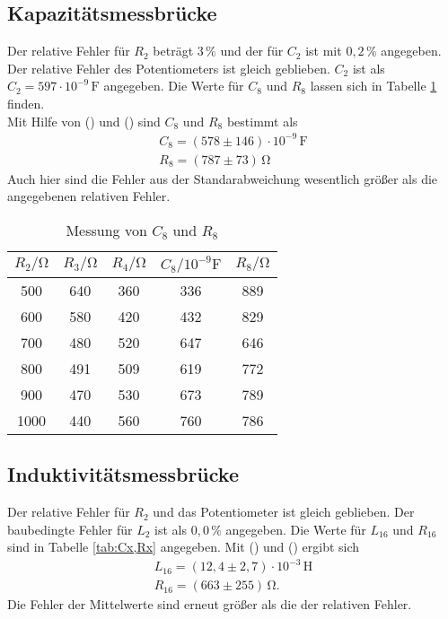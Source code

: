 \subsection{Kapazitätsmessbrücke}
Der relative Fehler für $R_2$ beträgt $3\,\%$ und der für $C_2$ ist mit $0,2 \,\%$ angegeben. Der relative Fehler des Potentiometers ist gleich geblieben.
$C_2$ ist als $C_2 = 597 \cdot 10^{-9}\,\unit{\farad}$ angegeben. Die Werte für $C_8$ und $R_8$ lassen sich in Tabelle \ref{tab:C8,R8} finden.\\
Mit Hilfe von () und () sind $C_8$ und $R_8$ bestimmt als
\begin{gather*}
  C_8 = (578 \pm 146)\cdot 10^{-9} \,\unit{\farad} \\
  R_8 = (787 \pm 73)\,\unit{\ohm}
\end{gather*}
Auch hier sind die Fehler aus der Standarabweichung wesentlich größer als die angegebenen relativen Fehler.

\begin{table}
  \centering
  \caption{Messung von $C_8$ und $R_8$}
  \label{tab:C8,R8}
  \begin{tabular}{c c c c c}
    \toprule
    $R_2/\unit{\ohm}$ & $R_3/\unit{\ohm}$ & $R_4/\unit{\ohm}$ & $C_8/10^{-9}\unit{\farad}$ & $R_8/\unit{\ohm}$ \\
    \midrule
     500 & 640 & 360 & 336 & 889 \\
     600 & 580 & 420 & 432 & 829 \\
     700 & 480 & 520 & 647 & 646 \\
     800 & 491 & 509 & 619 & 772 \\
     900 & 470 & 530 & 673 & 789 \\
    1000 & 440 & 560 & 760 & 786 \\
    \bottomrule
  \end{tabular}
\end{table}

\subsection{Induktivitätsmessbrücke}
Der relative Fehler für $R_2$ und das Potentiometer ist gleich geblieben. Der baubedingte Fehler für $L_2$ ist als $0,0\,\%$ angegeben.
Die Werte für $L_{16}$ und $R_{16}$ sind in Tabelle \ref{tab:Cx,Rx} angegeben. Mit () und () ergibt sich
\begin{gather*}
  L_{16} = (12,4 \pm 2,7)\cdot 10^{-3} \,\unit{\henry} \\
  R_{16} = (663 \pm 255)\,\unit{\ohm}.
\end{gather*}
Die Fehler der Mittelwerte sind erneut größer als die der relativen Fehler.

